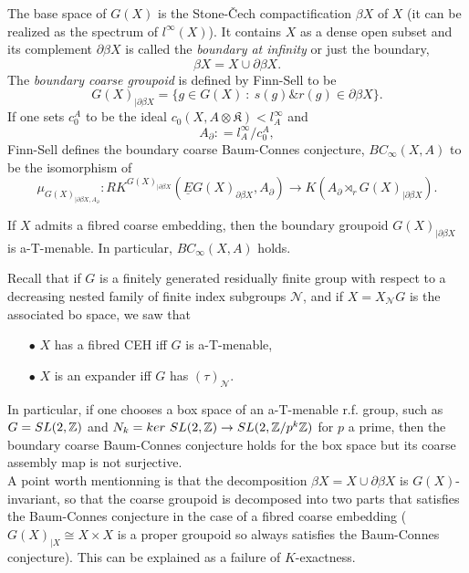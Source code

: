 The base space of $G(X)$ is the Stone-\v{C}ech compactification $\beta X$ of $X$ (it can be realized as the spectrum of $l^\infty(X)$). It contains $X$ as a dense open subset and its complement $\partial \beta X$ is called the \textit{boundary at infinity} or just the boundary,
\[\beta X = X \cup \partial \beta X.\]
The \textit{boundary coarse groupoid} is defined by Finn-Sell to be 
\[G(X)_{|\partial \beta X} = \{g \in G(X) \ : \ s(g) \& r(g) \in \partial \beta X\}.\]
If one sets $c_0^A$ to be the ideal $c_0(X,A\otimes \mathfrak K )< l^\infty_A$ and
\[A_\partial  : =l^\infty_A / c_0^A,\]
Finn-Sell defines the boundary coarse Baum-Connes conjecture, $BC_\infty(X,A)$ to be the isomorphism of 
\[\mu_{G(X)_{|\partial \beta X,A_\partial}}  : RK^{G(X)_{| \partial \beta X}}(\underline E G(X)_{\partial \beta X} , A_{\partial})\rightarrow  K(A_\partial \rtimes_r G(X)_{|\partial \beta X} ) .\]

\begin{thm}
If $X$ admits a fibred coarse embedding, then the boundary groupoid $G(X)_{|\partial \beta X}$ is a-T-menable. In particular, $BC_\infty(X,A)$ holds.
\end{thm}

Recall that if $G$ is a finitely generated residually finite group with respect to a decreasing nested family of finite index subgroups $\mathcal N$, and if $X=X_{\mathcal N}{G}$ is the associated bo space, we saw that
\begin{itemize}
\item[$\bullet$] $X$ has a fibred CEH iff $G$ is a-T-menable,
\item[$\bullet$] $X$ is an expander iff $G$ has $(\tau)_{\mathcal N}$.
\end{itemize}
In particular, if one chooses a box space of an a-T-menable r.f. group, such as $G=SL(2,\mathbb Z)$ and $N_k = ker \ SL(2,\mathbb Z ) \rightarrow SL(2,\mathbb Z /p^k \mathbb Z)$ for $p$ a prime, then the boundary coarse Baum-Connes conjecture holds for the box space but its coarse assembly map is not surjective. \\

A point worth mentionning is that the decomposition $\beta X = X \cup \partial \beta X$ is $G(X)$-invariant, so that the coarse groupoid is decomposed into two parts that satisfies the Baum-Connes conjecture in the case of a fibred coarse embedding ($G(X)_{|X} \cong X\times X$ is a proper groupoid so always satisfies the Baum-Connes conjecture). This can be explained as a failure of $K$-exactness.\\

